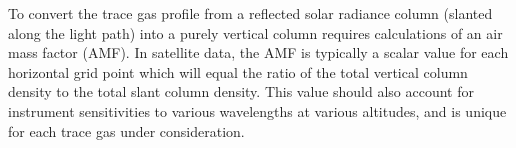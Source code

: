     To convert the trace gas profile from a reflected solar radiance column (slanted along the light path) into a purely vertical column requires calculations of an air mass factor (AMF).
    In satellite data, the AMF is typically a scalar value for each horizontal grid point which will equal the ratio of the total vertical column density to the total slant column density. This value should also account for instrument sensitivities to various wavelengths at various altitudes, and is unique for each trace gas under consideration.
  
